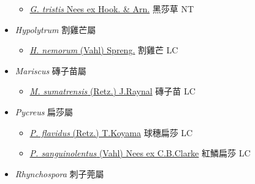 \begin{itemize}
  \begin{itemize}
        \item[] \href{http://www.theplantlist.org/tpl1.1/search?q=Gahnia+tristis}{\textit{G. tristis} Nees ex Hook. \& Arn.}   黑莎草 NT
  \end{itemize}
 \item[] \textit{Hypolytrum} 割雞芒屬
                    
  \begin{itemize}
        \item[] \href{http://www.theplantlist.org/tpl1.1/search?q=Hypolytrum+nemorum}{\textit{H. nemorum} (Vahl) Spreng.}   割雞芒 LC
  \end{itemize}
 \item[] \textit{Mariscus} 磚子苗屬
                    
  \begin{itemize}
        \item[] \href{http://www.theplantlist.org/tpl1.1/search?q=Mariscus+sumatrensis}{\textit{M. sumatrensis} (Retz.) J.Raynal}   磚子苗 LC
  \end{itemize}
 \item[] \textit{Pycreus} 扁莎屬
                    
  \begin{itemize}
        \item[] \href{http://www.theplantlist.org/tpl1.1/search?q=Pycreus+flavidus}{\textit{P. flavidus} (Retz.) T.Koyama}   球穗扁莎 LC
        \item[] \href{http://www.theplantlist.org/tpl1.1/search?q=Pycreus+sanguinolentus}{\textit{P. sanguinolentus} (Vahl) Nees ex C.B.Clarke}   紅鱗扁莎 LC
  \end{itemize}
 \item[] \textit{Rhynchospora} 刺子莞屬
                    

\end{itemize}
